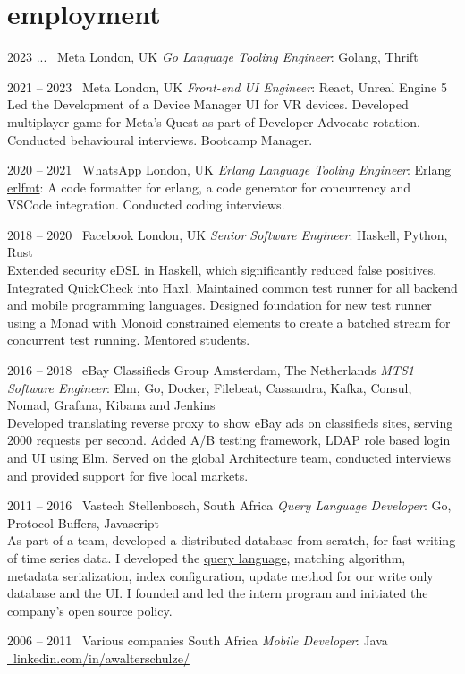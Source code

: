 \documentclass[print]{friggeri-cv-a4} %
\begin{document}
\section{employment}
\begin{entrylist}

\entry
{2023 ...}
{\infty\ Meta}
{London, UK}
{\emph{Go Language Tooling Engineer}: Golang, Thrift \\
}

\entry
{2021 -- 2023}
{\infty\ Meta}
{London, UK}
{\emph{Front-end UI Engineer}: React, Unreal Engine 5 \\
Led the Development of a Device Manager UI for VR devices. Developed multiplayer game for Meta's Quest as part of Developer Advocate rotation. Conducted behavioural interviews. Bootcamp Manager.
}

\entry
{2020 -- 2021}
{\faWhatsapp\ WhatsApp}
{London, UK}
{\emph{Erlang Language Tooling Engineer}: Erlang \\
\href{https://github.com/whatsapp/erlfmt}{erlfmt}: A code formatter for erlang, a code generator for concurrency and VSCode integration. Conducted coding interviews. 
}

\entry
{2018 -- 2020}
{\faFacebookSquare\ Facebook}
{London, UK}
{\emph{Senior Software Engineer}: Haskell, Python, Rust \\
Extended security eDSL in Haskell, which significantly reduced false positives. Integrated QuickCheck into Haxl.
Maintained common test runner for all backend and mobile programming languages. Designed foundation for new test runner using a Monad with Monoid constrained elements to create a batched stream for concurrent test running. Mentored students.
}

\entry
{2016 -- 2018}
{\faShoppingBasket\ eBay Classifieds Group}
{Amsterdam, The Netherlands}
{\emph{MTS1 Software Engineer}: Elm, Go, Docker, Filebeat, Cassandra, Kafka, Consul, Nomad, Grafana, Kibana and Jenkins \\
Developed translating reverse proxy to show eBay ads on classifieds sites, serving 2000 requests per second. Added A/B testing framework, LDAP role based login and UI using Elm. 
Served on the global Architecture team, conducted interviews and provided support for five local markets.
}

\entry
{2011 -- 2016}
{\faHeadphones\ Vastech}
{Stellenbosch, South Africa}
{\emph{Query Language Developer}: Go, Protocol Buffers, Javascript \\
As part of a team, developed a distributed database from scratch, for fast writing of time series data. I developed the \href{https://github.com/katydid/katydid}{query language}, matching algorithm, metadata serialization, index configuration, update method for our write only database and the UI. I founded and led the intern program and initiated the company's open source policy. 
}

\entry
{2006 -- 2011}
{\faMobile\ Various companies}
{South Africa}
{\emph{Mobile Developer}: Java \\
\href{https://www.linkedin.com/in/awalterschulze/}{\faLinkedinSquare\ linkedin.com/in/awalterschulze/}
}

\end{entrylist}
\end{document}
